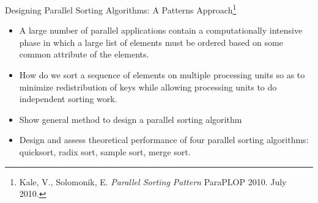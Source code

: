 \begin{frame}
\begin{figure}[ht!]
\end{figure}

\end{frame}

\begin{frame}{Designing Parallel Sorting Algorithms: A Patterns Approach\footnote{\tiny Kale, V., Solomonik, E. {\it Parallel Sorting Pattern} ParaPLOP 2010. July 2010.}}
\begin{itemize}
    \footnotesize \item \footnotesize A large number of parallel applications contain a computationally intensive phase in which a large list of elements must be ordered based on some common attribute of the elements.
    \item \footnotesize How do we sort a sequence of elements on multiple processing units so as to minimize redistribution of keys while allowing processing units to do independent sorting work.
    \item \footnotesize Show general method to design a parallel sorting algorithm 
     \item \footnotesize Design and assess theoretical performance of four parallel sorting algorithms: quicksort, radix sort, sample sort, merge sort.
\end{itemize}
\end{frame}

